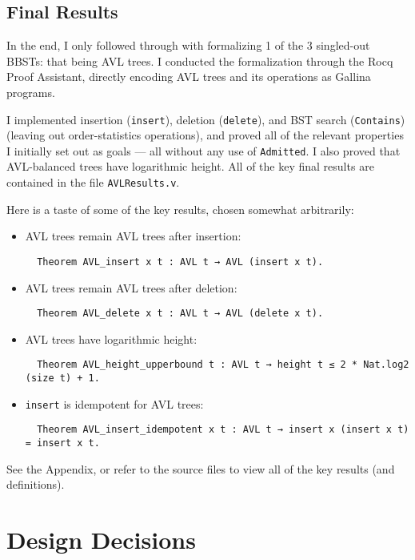 \documentclass[acmsmall, authorversion, nonacm, overload]{acmart}
\begin{document}
\subsection{Final Results}
In the end, I only followed through with formalizing 1 of the 3 singled-out BBSTs: that being AVL trees.
I conducted the formalization through the Rocq Proof Assistant, directly encoding
AVL trees and its operations as Gallina programs.

I implemented insertion (\texttt{insert}), deletion (\texttt{delete}), and BST search (\texttt{Contains})
(leaving out order-statistics operations),
and proved all of the relevant properties I initially set out as goals ---
all without any use of \texttt{Admitted}.
I also proved that AVL-balanced trees have logarithmic height.
All of the key final results are contained in the file \texttt{AVLResults.v}.

Here is a taste of some of the key results, chosen somewhat arbitrarily:
\begin{itemize}
\item AVL trees remain AVL trees after insertion:
  \begin{verbatim}
  Theorem AVL_insert x t : AVL t → AVL (insert x t).
  \end{verbatim}
\item AVL trees remain AVL trees after deletion:
  \begin{verbatim}
  Theorem AVL_delete x t : AVL t → AVL (delete x t).
  \end{verbatim}
\item AVL trees have logarithmic height:
  \begin{verbatim}
  Theorem AVL_height_upperbound t : AVL t → height t ≤ 2 * Nat.log2 (size t) + 1.
  \end{verbatim}
\item \texttt{insert} is idempotent for AVL trees:
  \begin{verbatim}
  Theorem AVL_insert_idempotent x t : AVL t → insert x (insert x t) = insert x t.
  \end{verbatim}
\end{itemize}
See the Appendix, or refer to the source files to view all of the key results (and definitions).

\section{Design Decisions}
\end{document}

